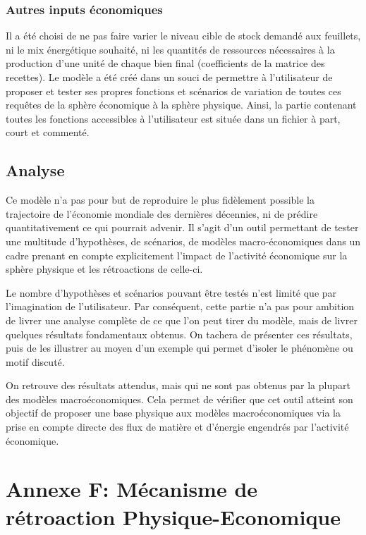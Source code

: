 \documentclass[12pt,a4paper]{article}%
\begin{document}
\subsubsection{Autres inputs économiques}

Il a été choisi de ne pas faire varier le niveau cible de stock demandé aux
feuillets, ni le mix énergétique souhaité, ni les quantités de ressources
nécessaires à la production d'une unité de chaque bien final (coefficients
de la matrice des recettes). Le modèle a été créé dans un souci de
permettre à l'utilisateur de proposer et tester ses propres fonctions et
scénarios de variation de toutes ces requêtes de la sphère économique
à la sphère physique. Ainsi, la partie contenant toutes les fonctions
accessibles à l'utilisateur est située dans un fichier à part, court
et commenté.

\subsection{Analyse}

Ce modèle n'a pas pour but de reproduire le plus fidèlement possible
la trajectoire de l'économie mondiale des dernières décennies, ni de
prédire quantitativement ce qui pourrait advenir. Il s'agit d'un outil
permettant de tester une multitude d'hypothèses, de scénarios, de
modèles macro-économiques dans un cadre prenant en compte explicitement
l'impact de l'activité économique sur la sphère physique et les
rétroactions de celle-ci.

Le nombre d'hypothèses et scénarios pouvant être testés n'est limité que
par l'imagination de l'utilisateur. Par conséquent, cette partie n'a pas pour
ambition de livrer une analyse complète de ce que l'on peut tirer du
modèle, mais de livrer quelques résultats fondamentaux obtenus. On tachera
de présenter ces résultats, puis de les illustrer au moyen d'un exemple qui
permet d'isoler le phénomène ou motif discuté.

On retrouve des résultats attendus, mais qui ne sont pas obtenus par la
plupart des modèles macroéconomiques. Cela permet de vérifier que cet
outil atteint son objectif de proposer une base physique aux modèles
macroéconomiques via la prise en compte directe des flux de matière et
d'énergie engendrés par l'activité économique.

\section{Annexe F: Mécanisme de rétroaction Physique-Economique}
\end{document}
